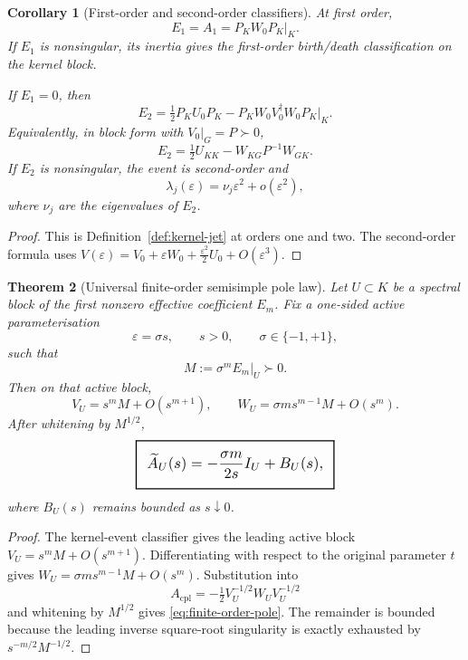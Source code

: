 \documentclass[11pt,a4paper]{article}
\numberwithin{equation}{section}
\newcommand{\geomboxed}[1]{%
  \setlength{\fboxsep}{8pt}%
  \setlength{\fboxrule}{0.9pt}%
  \fbox{\scalebox{1.18}{$\displaystyle #1$}}%
}
\theoremstyle{thmcompact}
\newtheorem{theorem}{Theorem}[section]
\newtheorem{corollary}[theorem]{Corollary}
\theoremstyle{remark}
\begin{document}
\begin{corollary}[First-order and second-order classifiers]
\label{cor:first-second-classifier}
At first order,
\[
E_1=A_1=P_KW_0P_K\big|_K.
\]
If $E_1$ is nonsingular, its inertia gives the first-order birth/death classification on the kernel block.

If $E_1=0$, then
\begin{equation}
E_2=\tfrac12 P_KU_0P_K-P_KW_0V_0^\dagger W_0P_K\big|_K.
\label{eq:E2-classifier}
\end{equation}
Equivalently, in block form with $V_0|_G=P\succ0$,
\[
E_2=\tfrac12 U_{KK}-W_{KG}P^{-1}W_{GK}.
\]
If $E_2$ is nonsingular, the event is second-order and
\[
\lambda_j(\varepsilon)=\nu_j\varepsilon^2+o(\varepsilon^2),
\]
where $\nu_j$ are the eigenvalues of $E_2$.
\end{corollary}

\begin{proof}
This is Definition~\ref{def:kernel-jet} at orders one and two. The second-order formula uses $V(\varepsilon)=V_0+\varepsilon W_0+\tfrac{\varepsilon^2}{2}U_0+O(\varepsilon^3)$.
\end{proof}

\begin{theorem}[Universal finite-order semisimple pole law]
\label{thm:finite-order-pole}
Let $U\subset K$ be a spectral block of the first nonzero effective coefficient $E_m$. Fix a one-sided active parameterisation
\[
\varepsilon=\sigma s,
\qquad
s>0,
\qquad
\sigma\in\{-1,+1\},
\]
such that
\[
M:=\sigma^mE_m|_U\succ0.
\]
Then on that active block,
\[
V_U=s^mM+O(s^{m+1}),
\qquad
W_U=\sigma m s^{m-1}M+O(s^m).
\]
After whitening by $M^{1/2}$,
\begin{equation}
\geomboxed{
\widetilde A_U(s)
=-\frac{\sigma m}{2s}I_U+B_U(s),
}
\label{eq:finite-order-pole}
\end{equation}
where $B_U(s)$ remains bounded as $s\downarrow0$.
\end{theorem}

\begin{proof}
The kernel-event classifier gives the leading active block $V_U=s^mM+O(s^{m+1})$. Differentiating with respect to the original parameter $t$ gives $W_U=\sigma m s^{m-1}M+O(s^m)$. Substitution into
\[
A_{\mathrm{cpl}}=-\tfrac12 V_U^{-1/2}W_UV_U^{-1/2}
\]
and whitening by $M^{1/2}$ gives \eqref{eq:finite-order-pole}. The remainder is bounded because the leading inverse square-root singularity is exactly exhausted by $s^{-m/2}M^{-1/2}$.
\end{proof}
\end{document}
